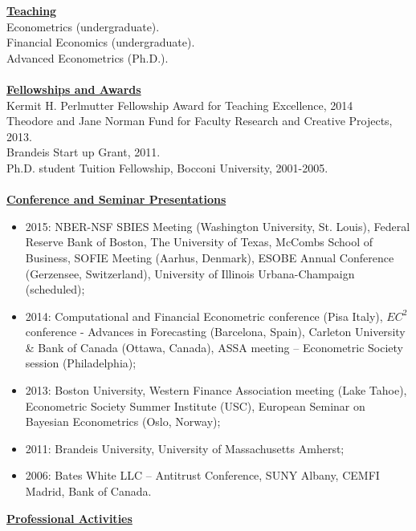 \documentclass[12pt]{article}
\begin{document}

\underline{\textbf{Teaching}}\\
Econometrics (undergraduate).\\
Financial Economics (undergraduate). \\
Advanced Econometrics (Ph.D.). \\ \\
\underline{\textbf{Fellowships and Awards}}\\
Kermit H. Perlmutter Fellowship Award for Teaching Excellence, 2014 \\
Theodore and Jane Norman Fund for Faculty Research and Creative Projects, 2013. \\
Brandeis Start up Grant, 2011. \\
Ph.D. student Tuition Fellowship, Bocconi University, 2001-2005.\\ \\
\underline{\textbf{Conference and Seminar Presentations}}
\begin{itemize}
  \item 2015: NBER-NSF SBIES Meeting (Washington University, St. Louis), Federal Reserve Bank of Boston, The University of Texas, McCombs School of Business, SOFIE Meeting (Aarhus, Denmark), ESOBE Annual Conference (Gerzensee, Switzerland), University of Illinois Urbana-Champaign (scheduled);
	\item 2014: Computational and Financial Econometric conference (Pisa Italy), $EC^2$ conference - Advances in Forecasting (Barcelona, Spain),  Carleton University & Bank of Canada (Ottawa, Canada), ASSA meeting -- Econometric Society session (Philadelphia);  
	\item 2013: Boston University, Western Finance Association meeting (Lake Tahoe), Econometric Society Summer Institute (USC), European Seminar on Bayesian Econometrics (Oslo, Norway); 
	\item 2011: Brandeis University, University of Massachusetts Amherst; 
	\item 2006: Bates White LLC -- Antitrust Conference, SUNY Albany, CEMFI Madrid, Bank of Canada.
\end{itemize}
\underline{\textbf{Professional Activities}}
\end{document}
